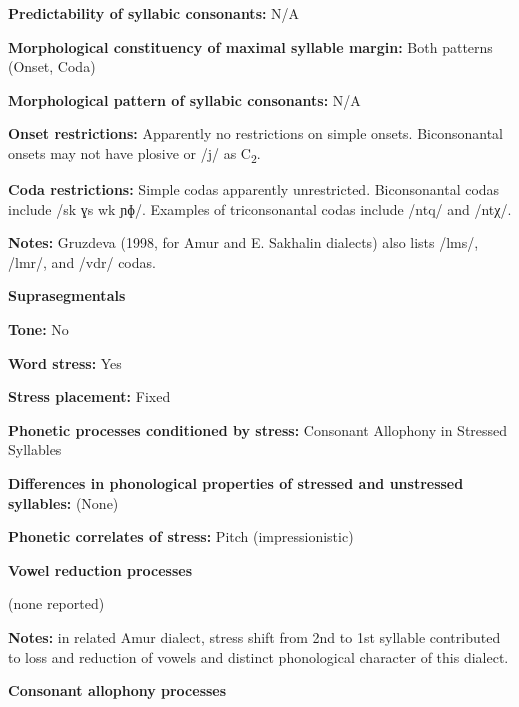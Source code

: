 \textbf{Predictability of syllabic consonants:} N/A



\textbf{Morphological constituency of maximal syllable margin:} Both patterns (Onset, Coda)



\textbf{Morphological pattern of syllabic consonants:} N/A



\textbf{Onset restrictions:} Apparently no restrictions on simple onsets. Biconsonantal onsets may not have plosive or /j/ as C\textsubscript{2}.



\textbf{Coda restrictions:} Simple codas apparently unrestricted. Biconsonantal codas include /sk ɣs wk ɲɸ/. Examples of triconsonantal codas include /ntq/ and /ntχ/.



\textbf{Notes:} Gruzdeva (1998, for Amur and E. Sakhalin dialects) also lists /lms/, /lmr/, and /vdr/ codas.



\textbf{Suprasegmentals}



\textbf{Tone:} No



\textbf{Word stress:} Yes



\textbf{Stress placement:} Fixed



\textbf{Phonetic processes conditioned by stress:} Consonant Allophony in Stressed Syllables



\textbf{Differences in phonological properties of stressed and unstressed syllables:} (None)



\textbf{Phonetic correlates of stress:} Pitch (impressionistic)



\textbf{Vowel reduction processes}



(none reported)



\textbf{Notes:} in related Amur dialect, stress shift from 2nd to 1st syllable contributed to loss and reduction of vowels and distinct phonological character of this dialect.



\textbf{Consonant allophony processes}




